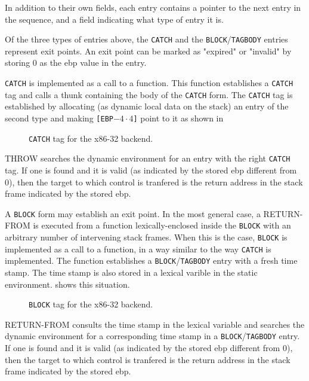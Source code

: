 In addition to their own fields, each entry contains a pointer to the
next entry in the sequence, and a field indicating what type of entry
it is.

Of the three types of entries above, the \texttt{CATCH} and the
\texttt{BLOCK}/\texttt{TAGBODY} entries represent exit points.  An
exit point can be marked as "expired" or "invalid" by storing 0 as the
ebp value in the entry.

\texttt{CATCH} is implemented as a call to a function.  This function
establishes a \texttt{CATCH} tag and calls a thunk containing the body
of the \texttt{CATCH} form.  The \texttt{CATCH} tag is established by
allocating (as dynamic local data on the stack) an entry of the second
type and making \texttt{[EBP$-4 \cdot 4$]} point to it as shown in

\begin{figure}
\begin{center}
\end{center}
\caption{\label{fig-x86-32-catch}
\texttt{CATCH} tag for the x86-32 backend.}
\end{figure}

THROW searches the dynamic environment for an entry with the right
\texttt{CATCH} tag.  If one is found and it is valid (as indicated by
the stored ebp different from 0), then the target to which control is
tranfered is the return address in the stack frame indicated by the
stored ebp.

A \texttt{BLOCK} form may establish an exit point.  In the most
general case, a RETURN-FROM is executed from a function
lexically-enclosed inside the \texttt{BLOCK} with an arbitrary number
of intervening stack frames.  When this is the case, \texttt{BLOCK} is
implemented as a call to a function, in a way similar to the way
\texttt{CATCH} is implemented.  The function establishes a
\texttt{BLOCK}/\texttt{TAGBODY} entry with a fresh time stamp.  The
time stamp is also stored in a lexical varible in the static
environment.   shows this situation.

\begin{figure}
\begin{center}
\end{center}
\caption{\label{fig-x86-32-block-tag}
\texttt{BLOCK} tag for the x86-32 backend.}
\end{figure}

RETURN-FROM consults the time stamp in the lexical variable and
searches the dynamic environment for a corresponding time stamp in a
\texttt{BLOCK}/\texttt{TAGBODY} entry.  If one is found and it is
valid (as indicated by the stored ebp different from 0), then the
target to which control is tranfered is the return address in the
stack frame indicated by the stored ebp.

